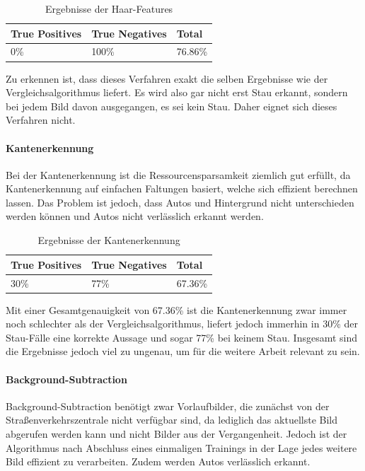 \begin{table}[ht]
  \centering
\scriptsize
    \begin{tabular}{ | l | l | l |}
    \hline
		True Positives & True Negatives & Total \\ \hline
    0\% &
		100\% &
		76.86\% \\
    \hline
    \end{tabular}
  \caption{Ergebnisse der Haar-Features}
\end{table}

Zu erkennen ist, dass dieses Verfahren exakt die selben Ergebnisse wie der Vergleichsalgorithmus liefert. Es wird also gar nicht erst Stau erkannt, sondern bei jedem Bild davon ausgegangen, es sei kein Stau. Daher eignet sich dieses Verfahren nicht.

\paragraph{Kantenerkennung}
Bei der Kantenerkennung ist die Ressourcensparsamkeit ziemlich gut erfüllt, da Kantenerkennung auf einfachen Faltungen basiert, welche sich effizient berechnen lassen.
Das Problem ist jedoch, dass Autos und Hintergrund nicht unterschieden werden können und Autos nicht verlässlich erkannt werden.

\begin{table}[ht]
  \centering
    \scriptsize
    \begin{tabular}{ | l | l | l |}
    \hline
		True Positives & True Negatives & Total \\ \hline
    30\% &
		77\% &
		67.36\% \\
    \hline
    \end{tabular}
  \caption{Ergebnisse der Kantenerkennung}
\end{table}

Mit einer Gesamtgenauigkeit von 67.36\% ist die Kantenerkennung zwar immer noch schlechter als der Vergleichsalgorithmus, liefert jedoch immerhin in 30\% der Stau-Fälle eine korrekte Aussage und sogar 77\% bei keinem Stau. Insgesamt sind die Ergebnisse jedoch viel zu ungenau, um für die weitere Arbeit relevant zu sein.

\paragraph{Background-Subtraction}
Background-Subtraction benötigt zwar Vorlaufbilder, die zunächst von der Straßenverkehrszentrale nicht verfügbar sind, da lediglich das aktuellste Bild abgerufen werden kann und nicht Bilder aus der Vergangenheit. Jedoch ist der Algorithmus nach Abschluss eines einmaligen Trainings in der Lage jedes weitere Bild effizient zu verarbeiten. Zudem werden Autos verlässlich erkannt.

